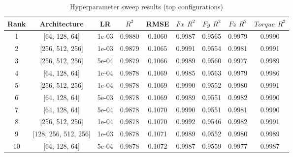\begin{table}[htbp]
  \centering
  \caption{Hyperparameter sweep results (top configurations)}
  \label{tab:sweep}
  \begin{tabular}{ccccccccc}
    \toprule
    Rank & Architecture & LR & $R^2$ & RMSE & $Fx$ $R^2$ & $Fy$ $R^2$ & $Fz$ $R^2$ & $Torque$ $R^2$ \\
    \midrule
    1 & [64, 128, 64] & 1e-03 & 0.9880 & 0.1060 & 0.9987 & 0.9565 & 0.9979 & 0.9990 \\
    2 & [256, 512, 256] & 1e-03 & 0.9879 & 0.1065 & 0.9991 & 0.9554 & 0.9981 & 0.9991 \\
    3 & [256, 512, 256] & 5e-04 & 0.9879 & 0.1066 & 0.9989 & 0.9560 & 0.9977 & 0.9989 \\
    4 & [64, 128, 64] & 1e-04 & 0.9878 & 0.1069 & 0.9985 & 0.9563 & 0.9979 & 0.9986 \\
    5 & [256, 512, 256] & 1e-04 & 0.9878 & 0.1069 & 0.9990 & 0.9552 & 0.9980 & 0.9991 \\
    6 & [64, 128, 64] & 5e-03 & 0.9878 & 0.1069 & 0.9989 & 0.9551 & 0.9982 & 0.9990 \\
    7 & [64, 128, 64] & 5e-04 & 0.9878 & 0.1070 & 0.9990 & 0.9551 & 0.9981 & 0.9990 \\
    8 & [256, 512, 256] & 1e-04 & 0.9878 & 0.1070 & 0.9992 & 0.9546 & 0.9982 & 0.9991 \\
    9 & [128, 256, 512, 256] & 1e-03 & 0.9878 & 0.1071 & 0.9989 & 0.9552 & 0.9980 & 0.9989 \\
    10 & [64, 128, 64] & 5e-04 & 0.9878 & 0.1072 & 0.9987 & 0.9559 & 0.9977 & 0.9987 \\
    \bottomrule
  \end{tabular}
\end{table}